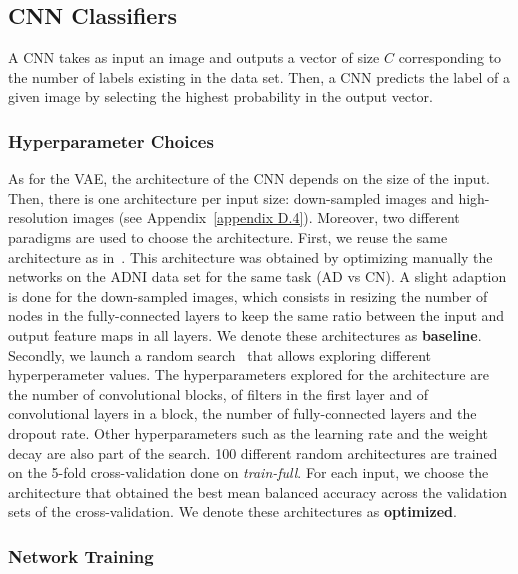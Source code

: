 \documentclass[10pt,journal,compsoc]{IEEEtran}
\begin{document}


\subsection{CNN Classifiers}

A CNN takes as input an image and outputs a vector of size $C$ corresponding to the number of labels existing in the data set. Then, a CNN predicts the label of a given image by selecting the highest probability in the output vector.

\subsubsection{Hyperparameter Choices}

As for the VAE, the architecture of the CNN depends on the size of the input. Then, there is one architecture per input size: down-sampled images and high-resolution images (see Appendix~\ref{appendix D.4}). Moreover, two different paradigms are used to choose the architecture. 
First, we reuse the same architecture as in~\cite{wen_convolutional_2020}. This architecture was obtained by optimizing manually the networks on the ADNI data set for the same task (AD vs CN). A slight adaption is done for the down-sampled images, which consists in resizing the number of nodes in the fully-connected layers to keep the same ratio between the input and output feature maps in all layers. We denote these architectures as \textbf{baseline}. Secondly, we launch a random search~\cite{bergstra_random_2012} that allows exploring different hyperperameter values. The hyperparameters explored for the architecture are the number of convolutional blocks, of filters in the first layer and of convolutional layers in a block, the number of fully-connected layers and the dropout rate. Other hyperparameters such as the learning rate and the weight decay are also part of the search. 100 different random architectures are trained on the 5-fold cross-validation done on \textit{train-full}. For each input, we choose the architecture that obtained the best mean balanced accuracy across the validation sets of the cross-validation. We denote these architectures as \textbf{optimized}.


\subsubsection{Network Training}
\end{document}
